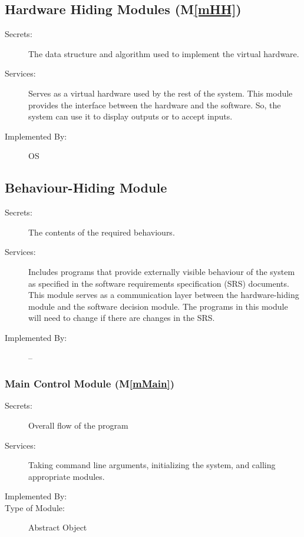 \documentclass[12pt, titlepage]{article}
\newcommand{\mref}[1]{M\ref{#1}}
\begin{document}
\subsection{Hardware Hiding Modules (\mref{mHH})}

\begin{description}
\item[Secrets:]The data structure and algorithm used to implement the virtual
  hardware.
\item[Services:]Serves as a virtual hardware used by the rest of the
  system. This module provides the interface between the hardware and the
  software. So, the system can use it to display outputs or to accept inputs.
\item[Implemented By:] OS
\end{description}

\subsection{Behaviour-Hiding Module}

\begin{description}
\item[Secrets:]The contents of the required behaviours.
\item[Services:]Includes programs that provide externally visible behaviour of
  the system as specified in the software requirements specification (SRS)
  documents. This module serves as a communication layer between the
  hardware-hiding module and the software decision module. The programs in this
  module will need to change if there are changes in the SRS.
\item[Implemented By:] --
\end{description}

\subsubsection{Main Control Module (\mref{mMain})}
\begin{description}
\item[Secrets:]Overall flow of the program
\item[Services:]Taking command line arguments, initializing the system, and calling appropriate modules.
\item[Implemented By:] \progname{}
\item[Type of Module:] Abstract Object
\end{description}
\end{document}
